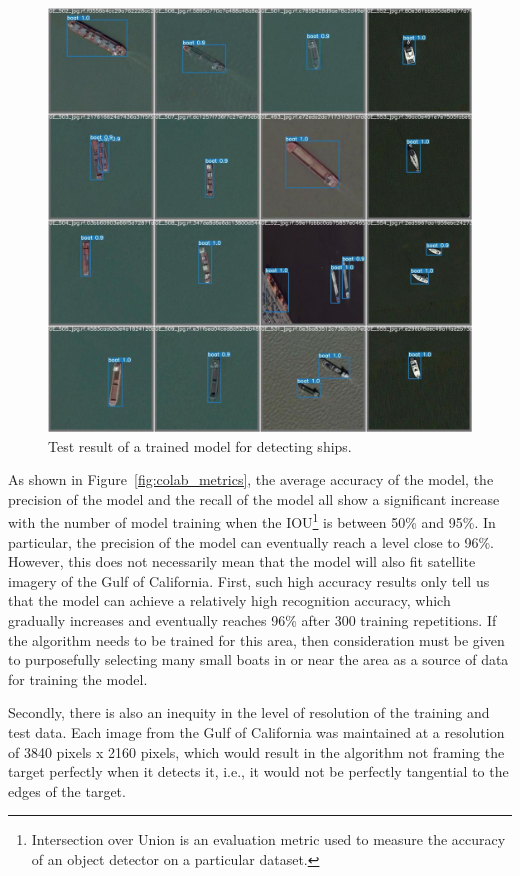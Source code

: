 \begin{figure}[t]
    \centerline{\includegraphics[width=\columnwidth]{img/test_batch1_pred.jpeg}}
    \caption{Test result of a trained model for detecting ships.}
    \label{fig:test_batch1_pred}
\end{figure}

As shown in Figure~\ref{fig:colab_metrics}, the average accuracy of the model, the precision of the model and the recall of the model all show a significant increase with the number of model training when the IOU\footnote{Intersection over Union is an evaluation metric used to measure the accuracy of an object detector on a particular dataset.} is between 50\% and 95\%. In particular, the precision of the model can eventually reach a level close to 96\%. However, this does not necessarily mean that the model will also fit satellite imagery of the Gulf of California. First, such high accuracy results only tell us that the model can achieve a relatively high recognition accuracy, which gradually increases and eventually reaches 96\% after 300 training repetitions. If the algorithm needs to be trained for this area, then consideration must be given to purposefully selecting many small boats in or near the area as a source of data for training the model. 

Secondly, there is also an inequity in the level of resolution of the training and test data. Each image from the Gulf of California was maintained at a resolution of 3840 pixels x 2160 pixels, which would result in the algorithm not framing the target perfectly when it detects it, i.e., it would not be perfectly tangential to the edges of the target.


